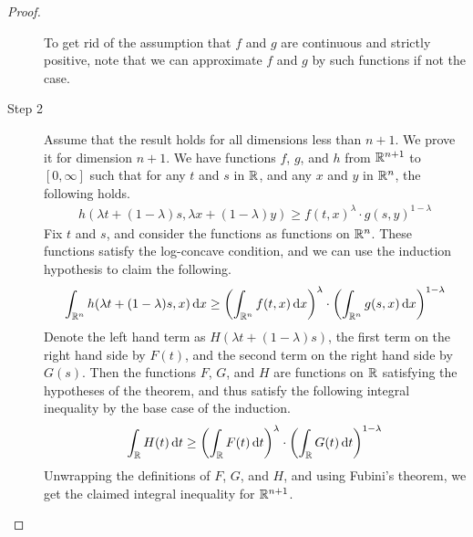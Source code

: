 \documentclass[11pt]{article}
\begin{document}
\begin{proof}
\begin{description}
    To get rid of the assumption that $f$ and $g$ are continuous and strictly positive, note that we can approximate $f$ and $g$ by such functions if not the case.
  \item[Step 2] Assume that the result holds for all dimensions less than $n+1$. We prove it for dimension $n+1$.
    We have functions $f$, $g$, and $h$ from $\mathbb{R}^{n+1}$ to $[0, \infty]$ such that for any $t$ and $s$ in $\mathbb{R}$, and any $x$ and $y$ in $\mathbb{R}^n$, the following holds.
    \begin{align*}
      h(\lambda t + (1-\lambda)s, \lambda x + (1-\lambda)y)
      \geq f(t, x)^{\lambda} \cdot g(s,y)^{1-\lambda}
    \end{align*}
    Fix $t$ and $s$, and consider the functions as functions on $\mathbb{R}^n$.
    These functions satisfy the log-concave condition, and we can use the induction hypothesis to claim the following.
    \begin{align*}
      \int_{\mathbb{R}^n} h(\lambda t + (1-\lambda)s, x) \mathrm{\,d} x
      \geq \left( \int_{\mathbb{R}^n} f(t,x) \mathrm{\,d} x \right)^{\lambda} \cdot \left( \int_{\mathbb{R}^n} g(s,x) \mathrm{\,d} x \right)^{1- \lambda}
    \end{align*}
    Denote the left hand term as $H(\lambda t + (1-\lambda)s)$, the first term on the right hand side by $F(t)$, and the second term on the right hand side by $G(s)$.
    Then the functions $F$, $G$, and $H$ are functions on $\mathbb{R}$ satisfying the hypotheses of the theorem, and thus satisfy the following integral inequality by the base case of the induction.
    \begin{align*}
      \int_{\mathbb{R}} H(t) \mathrm{\,d} t \geq \left( \int_{\mathbb{R}} F(t) \mathrm{\,d} t \right)^{\lambda} \cdot \left( \int_{\mathbb{R}} G(t) \mathrm{\,d} t \right)^{1-\lambda}
    \end{align*}
    Unwrapping the definitions of $F$, $G$, and $H$, and using Fubini's theorem, we get the claimed integral inequality for $\mathbb{R}^{n+1}$.
  \end{description}
\end{proof}
\end{document}
